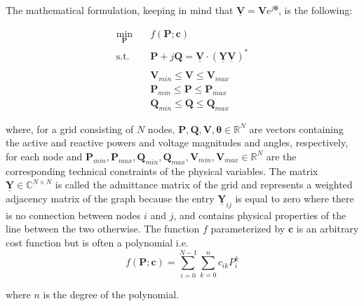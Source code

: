 The mathematical formulation, keeping in mind that $\boldsymbol{\underline{V}} = \boldsymbol{V}e^{j\boldsymbol{\theta}}$, is the following:

\newcommand{\complexpower}{\underline{\boldsymbol{V}} \cdot \left(\underline{\boldsymbol{Y}}\underline{\boldsymbol{V}}\right)^*}

\begin{equation}
    \label{eq:opf_formulation}
    \begin{aligned}
        \min_{\boldsymbol{P}} \quad & f(\boldsymbol{P}; \boldsymbol{c})\\%
        \textrm{s.t.} %
        \quad & \boldsymbol{P} + j\boldsymbol{Q} = \complexpower\\ \\
        \quad & \boldsymbol{V}_{min} \leq \boldsymbol{V} \leq \boldsymbol{V}_{max} \\
        \quad & \boldsymbol{P}_{min} \leq \boldsymbol{P} \leq \boldsymbol{P}_{max} \\
        \quad & \boldsymbol{Q}_{min} \leq \boldsymbol{Q} \leq \boldsymbol{Q}_{max}
    \end{aligned}
\end{equation}

\noindent where, for a grid consisting of $N$ nodes, $\boldsymbol{P}, \boldsymbol{Q}, \boldsymbol{V}, \boldsymbol{\theta} \in \mathbb{R}^N$ are vectors containing the
active and reactive powers and voltage magnitudes and angles, respectively, for each node and
$\boldsymbol{P}_{min}, \boldsymbol{P}_{max}, \boldsymbol{Q}_{min}, \boldsymbol{Q}_{max}, \boldsymbol{V}_{min}, \boldsymbol{V}_{max} \in \mathbb{R}^N$
are the corresponding technical constraints of the physical variables.
The matrix $\boldsymbol{\underline{Y}} \in \mathbb{C}^{N \times N}$ is called the admittance matrix
of the grid and represents a weighted adjacency matrix of the graph because the entry $\boldsymbol{\underline{Y}}_{ij}$ is equal
to zero where there is no connection between nodes $i$ and $j$, and contains physical properties of the line between the two otherwise.
The function $f$ parameterized by $\boldsymbol{c}$ is an arbitrary cost function but is often a polynomial i.e.
\[f(\boldsymbol{P}; \boldsymbol{c}) = \sum_{i=0}^{N - 1} \sum_{k=0}^n c_{ik}P_i^k\]

\noindent where $n$ is the degree of the polynomial.